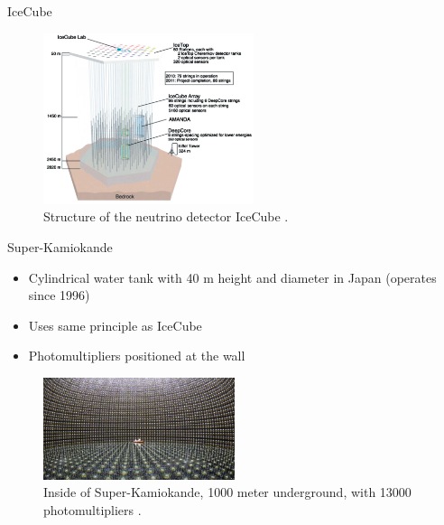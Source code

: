 \documentclass[aspectratio=1610, 10pt]{beamer}
\begin{document}
\begin{frame}{IceCube}
  \begin{figure}
    \includegraphics[width=0.55\textwidth]{images/icecube.png}
    \caption{Structure of the neutrino detector IceCube \cite{neutrino}.}
  \end{figure}
\end{frame}


\begin{frame}{Super-Kamiokande}
  \begin{itemize}
    \item Cylindrical water tank with 40 m height and diameter in Japan (operates since 1996)
    \medskip
    \item Uses same principle as IceCube
    \medskip
    \item Photomultipliers positioned at the wall
  \end{itemize}
  \begin{figure}
    \includegraphics[width=0.5\textwidth]{images/kamiokande.png}
    \caption{Inside of Super-Kamiokande, 1000 meter underground, with 13000 photomultipliers \cite{kamio}.}
  \end{figure}
\end{frame}
\end{document}
